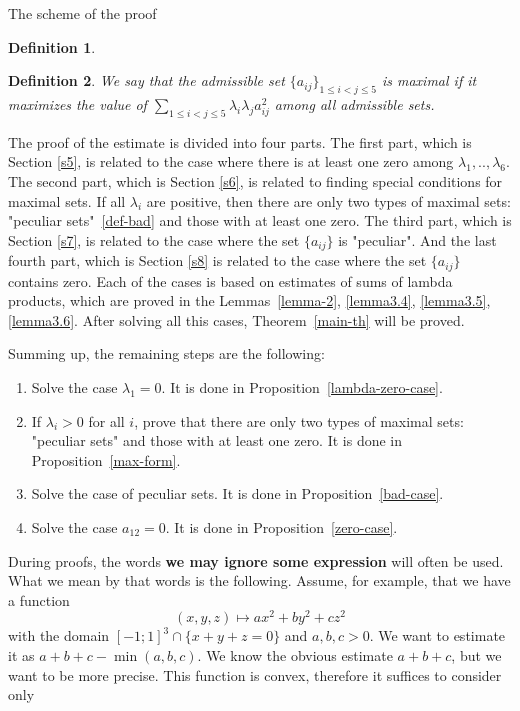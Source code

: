 \documentclass[12pt]{article}
\newtheorem{definition}{Definition}[section]
\begin{document}
\begin{section}{The scheme of the proof}
\begin{definition}
    \end{definition}

\begin{definition}
    We say that the admissible set  $\{a_{ij}\}_{1\leq i<j\leq 5}$ is maximal if it maximizes the value of  $\sum_{1\leq i<j\leq 5}\lambda_{i}\lambda_{j}a_{ij}^2$ among all admissible sets.
\end{definition}

The proof of the estimate is divided into four parts. The first part, which is Section \ref{s5}, is related to the case where there is at least one zero among $\lambda_{1},..,\lambda_{6}.$ The second part, which is Section \ref{s6}, is related to finding special conditions for maximal sets. If all $\lambda_{i}$ are positive, then there are only two types of maximal sets: "peculiar sets"~\ref{def-bad} and those with at least one zero. The third part, which is Section \ref{s7}, is related to the case where the set $\{a_{ij}\}$ is "peculiar". And the last fourth part, which is Section \ref{s8} is related to the case where the set $\{a_{ij}\}$ contains zero. Each of the cases is based on estimates of sums of lambda products, which are proved in the Lemmas~\ref{lemma-2}, \ref{lemma3.4}, \ref{lemma3.5}, \ref{lemma3.6}. After solving all this cases, Theorem~\ref{main-th} will be proved. 

Summing up, the remaining steps are the following:

\begin{enumerate}
    \item Solve the case $\lambda_{1}=0.$ It is done in Proposition~\ref{lambda-zero-case}.
    \item If $\lambda_{i}>0$ for all $i$, prove that there are only two types of maximal sets: "peculiar sets" and those with at least one zero. It is done in Proposition~\ref{max-form}. 
    \item Solve the case of peculiar sets. It is done in Proposition~\ref{bad-case}.
    \item Solve the case  $a_{12}=0$. It is done in Proposition~\ref{zero-case}.
    
\end{enumerate}


    During proofs, the words \textbf{we may ignore some  expression} will often be used. What we mean by that words is the following. Assume, for example, that we have a function $$(x,y,z)\mapsto ax^2 + by^2 + cz^2$$ with the domain $[-1;1]^{3}\cap \{x+y+z=0\}$ and $a,b,c > 0$. We want to estimate it as $a+b+c - \min(a,b,c).$ We know the obvious estimate $a+b+c$, but we want to be more precise. This function is convex, therefore it suffices to consider only 
    

\end{section}
\end{document}
